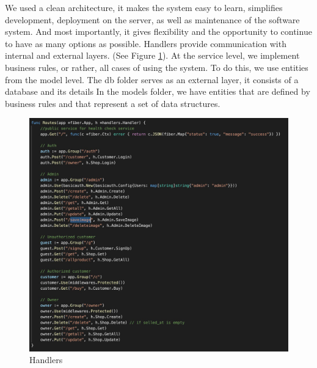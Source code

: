 We used a clean architecture, it makes the system easy to learn, simplifies development, deployment on the server, as well as maintenance of the software system. And most importantly, it gives flexibility and the opportunity to continue to have as many options as possible. Handlers provide communication with internal and external layers. (See Figure \ref{fig:backend2}). At the service level, we implement business rules, or rather, all cases of using the system. To do this, we use entities from the model level. The db folder serves as an external layer, it consists of a database and its details In the models folder, we have entities that are defined by business rules and that represent a set of data structures.
\begin{figure}[ht!]
    \centering
    \includegraphics[scale=0.7]{figures/backend2.jpg}
    \caption{Handlers}
    \label{fig:backend2}
\end{figure}
\clearpage

